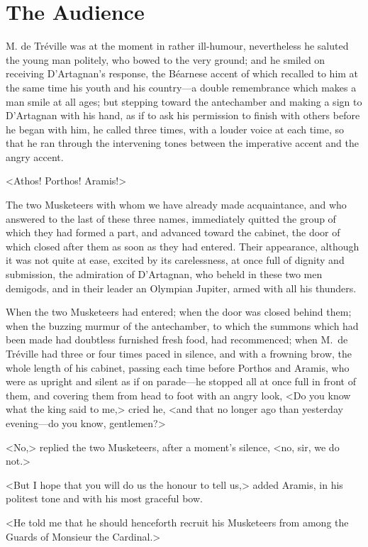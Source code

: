 
\chapter{The Audience} 
	
\lettrine{M}{.} de Tréville was at the moment in rather ill-humour, nevertheless he saluted the young man politely, who bowed to the very ground; and he smiled on receiving D'Artagnan's response, the Béarnese accent of which recalled to him at the same time his youth and his country—a double remembrance which makes a man smile at all ages; but stepping toward the antechamber and making a sign to D'Artagnan with his hand, as if to ask his permission to finish with others before he began with him, he called three times, with a louder voice at each time, so that he ran through the intervening tones between the imperative accent and the angry accent. 

<Athos! Porthos! Aramis!> 

The two Musketeers with whom we have already made acquaintance, and who answered to the last of these three names, immediately quitted the group of which they had formed a part, and advanced toward the cabinet, the door of which closed after them as soon as they had entered. Their appearance, although it was not quite at ease, excited by its carelessness, at once full of dignity and submission, the admiration of D'Artagnan, who beheld in these two men demigods, and in their leader an Olympian Jupiter, armed with all his thunders. 

When the two Musketeers had entered; when the door was closed behind them; when the buzzing murmur of the antechamber, to which the summons which had been made had doubtless furnished fresh food, had recommenced; when M.~de Tréville had three or four times paced in silence, and with a frowning brow, the whole length of his cabinet, passing each time before Porthos and Aramis, who were as upright and silent as if on parade—he stopped all at once full in front of them, and covering them from head to foot with an angry look, <Do you know what the king said to me,> cried he, <and that no longer ago than yesterday evening—do you know, gentlemen?> 

<No,> replied the two Musketeers, after a moment's silence, <no, sir, we do not.> 

<But I hope that you will do us the honour to tell us,> added Aramis, in his politest tone and with his most graceful bow. 

<He told me that he should henceforth recruit his Musketeers from among the Guards of Monsieur the Cardinal.> 

